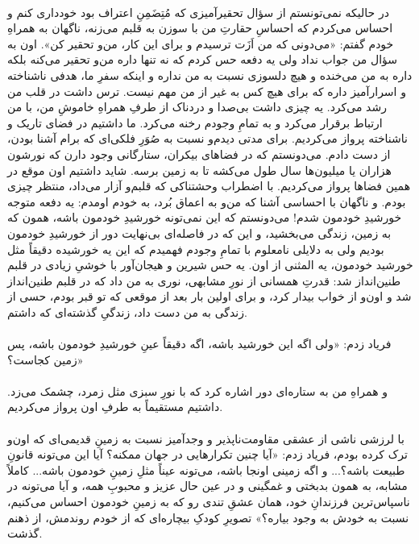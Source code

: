 \documentclass[12pt]{book}
\begin{document}
    \paragraph{}
    در حالیکه نمی‌تونستم از سؤال تحقیرآمیزی که مُتِضَمِنِ اعتراف بود خودداری کنم و احساس می‌کردم که احساسِ حقارتِ من با سوزن به قلبم می‌زنه، ناگهان به همراهِ خودم گفتم: «می‌دونی که من اَزَت ترسیدم و برای این کار، من‌و تحقیر کن». اون به سؤال من جواب نداد ولی یه دفعه حس کردم که نه تنها داره من‌و تحقیر می‌کنه بلکه داره به من می‌خنده و هیچ دلسوزی نسبت به من نداره و اینکه سفرِ ما، هدفی ناشناخته و اسرارآمیز داره که برای هیچ کس به غیر از من مهم نیست. ترس داشت در قلب من رشد می‌کرد. یه چیزی داشت بی‌صدا و دردناک از طرفِ همراهِ خاموشِ من، با من ارتباط برقرار می‌کرد و به تمامِ وجودم رخنه می‌کرد. ما داشتیم در فضای تاریک و ناشناخته پرواز می‌کردیم. برای مدتی دیدم‌و نسبت به صُوَرِ فلکی‌ای که برام آشنا بودن، از دست دادم. می‌دونستم که در فضاهای بیکران، ستارگانی وجود دارن که نورشون هزاران یا میلیون‌ها سال طول می‌کشه تا به زمین برسه. شاید داشتیم اون موقع در همین فضاها پرواز می‌کردیم. با اضطراب وحشتناکی که قلبم‌و آزار می‌داد، منتظر چیزی بودم. و ناگهان با احساسی آشنا که من‌و به اعماق بُرد، به خودم اومدم: یه دفعه متوجه خورشیدِ خودمون شدم! می‌دونستم که این نمی‌تونه خورشیدِ خودمون باشه، همون که به زمین، زندگی می‌بخشید، و این که در فاصله‌ای بی‌نهایت دور از خورشیدِ خودمون بودیم ولی به دلایلی نامعلوم با تمامِ وجودم فهمیدم که این یه خورشیده دقیقاً مثل خورشید خودمون، یه المثنی از اون. یه حس شیرین و هیجان‌آور با خوشیِ زیادی در قلبم طنین‌انداز شد: قدرتِ همسانی از نورِ مشابهی، نوری به من داد که در قلبم طنین‌انداز شد و اون‌و از خواب بیدار کرد، و برای اولین بار بعد از موقعی که تو قبر بودم، حسی از زندگی به من دست داد، زندگیِ گذشته‌ای که داشتم.

    \paragraph{}
    فریاد زدم: «ولی اگه این خورشید باشه، اگه دقیقاً عینِ خورشیدِ خودمون باشه، پس زمین کجاست؟»

    \paragraph{}
    و همراهِ من به ستاره‌ای دور اشاره کرد که با نورِ سبزی مثل زمرد، چشمک می‌زد. داشتیم مستقیماً به طرفِ اون پرواز می‌کردیم.

    \paragraph{}
    با لرزشی ناشی از عشقی مقاومت‌ناپذیر و وجدآمیز نسبت به زمینِ قدیمی‌ای که اون‌و ترک کرده بودم، فریاد زدم: «آیا چنین تکرارهایی در جهان ممکنه؟ آیا این می‌تونه قانونِ طبیعت باشه؟... و اگه زمینی اونجا باشه، می‌تونه عیناً مثلِ زمینِ خودمون باشه... کاملاً مشابه، به همون بدبختی و غمگینی و در عین حال عزیز و محبوبِ همه، و آیا می‌تونه در ناسپاس‌ترین فرزندانِ خود، همان عشقِ تندی رو که به زمینِ خودمون احساس می‌کنیم، نسبت به خودش به وجود بیاره؟» تصویرِ کودکِ بیچاره‌ای که از خودم روندمش، از ذهنم گذشت.
\end{document}
